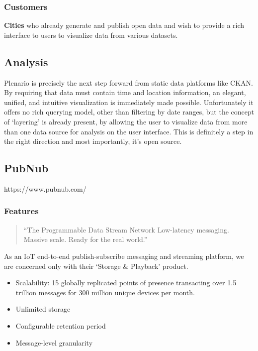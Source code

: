 \subsubsection{Customers}
\textbf{Cities} who already generate and publish open data and wish to provide a rich
interface to users to visualize data from various datasets.

\subsection{Analysis}
Plenario is precisely the next step forward from static data platforms like CKAN.
By requiring that data must contain time and location information, an elegant,
unified, and intuitive visualization is immediately made possible. Unfortunately
it offers no rich querying model, other than filtering by date ranges, but
the concept of `layering' is already present, by allowing the user to visualize
data from more than one data source for analysis on the user interface.
This is definitely a step in the right direction and most importantly, it's open source.

\subsection{PubNub}\label{pubnub}

https://www.pubnub.com/

\subsubsection{Features}\label{features-1}

\begin{quotation}
``The Programmable Data Stream Network
Low-latency messaging. Massive scale. Ready for the real world.''
\end{quotation}

As an IoT end-to-end publish-subscribe messaging and streaming platform,
we are concerned only with their `Storage \& Playback' product.

\begin{itemize}
\tightlist
\item
  Scalability: 15 globally replicated points of presence transacting over 1.5 trillion
messages for 300 million unique devices per month.
\item
  Unlimited storage
\item
  Configurable retention period
\item
  Message-level granularity
\end{itemize}

